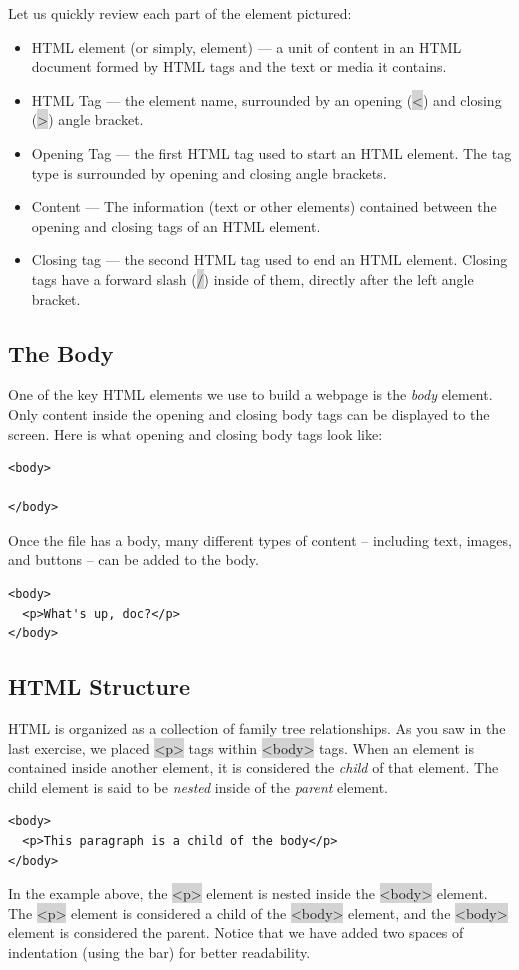 \documentclass[11pt]{article}
\begin{document}
Let us quickly review each part of the element pictured:
\begin{itemize}[leftmargin = *]
\item HTML element (or simply, element) — a unit of content in an HTML document formed by HTML tags and the text or media it contains.
\item HTML Tag — the element name, surrounded by an opening (\colorbox{lightgray}{<}) and closing (\colorbox{lightgray}{>}) angle bracket. 
\item Opening Tag — the first HTML tag used to start an HTML element. The tag type is surrounded by opening and closing angle brackets.
\item Content — The information (text or other elements) contained between the opening and closing tags of an HTML element.
\item Closing tag — the second HTML tag used to end an HTML element. Closing tags have a forward slash (\colorbox{lightgray}{$/$}) inside of them, directly after the left angle bracket.
\end{itemize}

\subsection{The Body}
One of the key HTML elements we use to build a webpage is the \textit{body} element. Only content inside the opening and closing body tags can be displayed to the screen. Here is what opening and closing body tags look like:
\begin{lstlisting}
<body>

</body>
\end{lstlisting}
Once the file has a body, many different types of content – including text, images, and buttons – can be added to the body.
\begin{lstlisting}
<body>
  <p>What's up, doc?</p>
</body>
\end{lstlisting}

\subsection{HTML Structure}
HTML is organized as a collection of family tree relationships. As you saw in the last exercise, we placed \colorbox{lightgray}{<p>} tags within \colorbox{lightgray}{<body>} tags. When an element is contained inside another element, it is considered the \textit{child} of that element. The child element is said to be \textit{nested} inside of the \textit{parent} element.
\begin{lstlisting}
<body>
  <p>This paragraph is a child of the body</p>
</body>
\end{lstlisting}
In the example above, the \colorbox{lightgray}{<p>} element is nested inside the \colorbox{lightgray}{<body>} element. The \colorbox{lightgray}{<p>} element is considered a child of the \colorbox{lightgray}{<body>} element, and the \colorbox{lightgray}{<body>} element is considered the parent. Notice that we have added two spaces of indentation (using the  bar) for better readability. 
\end{document}
